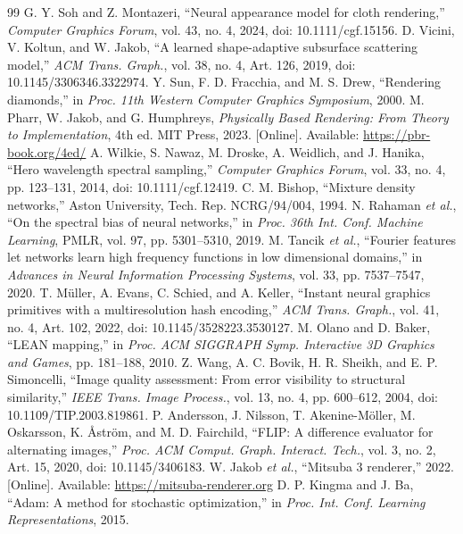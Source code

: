 \documentclass[conference]{IEEEtran}
\begin{document}
\begin{thebibliography}{99}
 G. Y. Soh and Z. Montazeri, ``Neural appearance model for cloth
rendering,'' \emph{Computer Graphics Forum}, vol. 43, no. 4, 2024,
doi: 10.1111/cgf.15156.
 D. Vicini, V. Koltun, and W. Jakob, ``A learned shape-adaptive
subsurface scattering model,'' \emph{ACM Trans. Graph.}, vol. 38, no. 4,
Art. 126, 2019, doi: 10.1145/3306346.3322974.
 Y. Sun, F. D. Fracchia, and M. S. Drew, ``Rendering diamonds,''
in \emph{Proc. 11th Western Computer Graphics Symposium}, 2000.
 M. Pharr, W. Jakob, and G. Humphreys,
\emph{Physically Based Rendering: From Theory to Implementation}, 4th ed.
MIT Press, 2023. [Online]. Available: \url{https://pbr-book.org/4ed/}
 A. Wilkie, S. Nawaz, M. Droske, A. Weidlich, and J. Hanika,
``Hero wavelength spectral sampling,'' \emph{Computer Graphics Forum}, vol. 33,
no. 4, pp. 123--131, 2014, doi: 10.1111/cgf.12419.
 C. M. Bishop, ``Mixture density networks,'' Aston University,
Tech. Rep. NCRG/94/004, 1994.
 N. Rahaman \emph{et al.}, ``On the spectral bias of neural
networks,'' in \emph{Proc. 36th Int. Conf. Machine Learning}, PMLR, vol. 97,
pp. 5301--5310, 2019.
 M. Tancik \emph{et al.}, ``Fourier features let networks learn
high frequency functions in low dimensional domains,'' in \emph{Advances in
Neural Information Processing Systems}, vol. 33, pp. 7537--7547, 2020.
 T. M\"uller, A. Evans, C. Schied, and A. Keller,
``Instant neural graphics primitives with a multiresolution hash encoding,''
\emph{ACM Trans. Graph.}, vol. 41, no. 4, Art. 102, 2022,
doi: 10.1145/3528223.3530127.
 M. Olano and D. Baker, ``LEAN mapping,'' in \emph{Proc. ACM
SIGGRAPH Symp. Interactive 3D Graphics and Games}, pp. 181--188, 2010.
 Z. Wang, A. C. Bovik, H. R. Sheikh, and E. P. Simoncelli,
``Image quality assessment: From error visibility to structural similarity,''
\emph{IEEE Trans. Image Process.}, vol. 13, no. 4, pp. 600--612, 2004,
doi: 10.1109/TIP.2003.819861.
 P. Andersson, J. Nilsson, T. Akenine-M\"oller,
M. Oskarsson, K. \AA str\"om, and M. D. Fairchild,
``FLIP: A difference evaluator for alternating images,''
\emph{Proc. ACM Comput. Graph. Interact. Tech.}, vol. 3, no. 2,
Art. 15, 2020, doi: 10.1145/3406183.
 W. Jakob \emph{et al.}, ``Mitsuba 3 renderer,'' 2022.
[Online]. Available: \url{https://mitsuba-renderer.org}
 D. P. Kingma and J. Ba, ``Adam: A method for stochastic
optimization,'' in \emph{Proc. Int. Conf. Learning Representations}, 2015.
\end{thebibliography}
\end{document}
